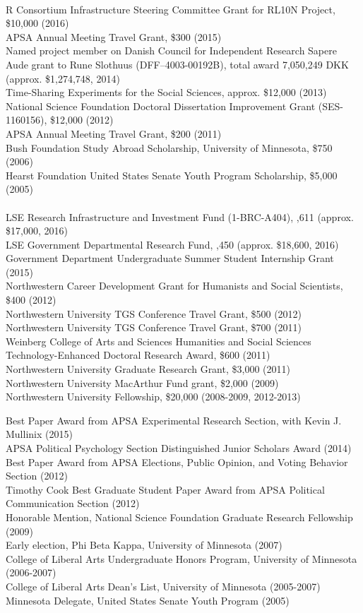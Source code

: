 \documentclass[12pt]{article}
\renewcommand{\section}[1]{\pagebreak[3]%
    \llap{\scshape\smash{\parbox[t]{\marginparwidth}{\raggedright {\color{lg}#1}}}}%
    \vspace{-\baselineskip}\par}
\newcommand{\topic}[1]{\pagebreak[3]\indent {\color{lg}{\footnotesize #1 }}\\}
\newcommand{\entry}[1]{\indent {\color{lg}\guillemotright}\hspace{2pt}#1\vspace{.25em}\\}
\begin{document}
\section{Grants \&\\Funding}
\topic{External Sources}
	\entry{R Consortium Infrastructure Steering Committee Grant for RL10N Project, \$10,000 (2016)}
	\entry{APSA Annual Meeting Travel Grant, \$300 (2015)}
	\entry{Named project member on Danish Council for Independent Research Sapere Aude grant to Rune Slothuus (DFF–4003-00192B), total award 7,050,249 DKK (approx. \$1,274,748, 2014)}
	\entry{Time-Sharing Experiments for the Social Sciences, approx. \$12,000 (2013)}
	\entry{National Science Foundation Doctoral Dissertation Improvement Grant (SES-1160156), \$12,000 (2012)}
	\entry{APSA Annual Meeting Travel Grant, \$200 (2011)}
	\entry{Bush Foundation Study Abroad Scholarship, University of Minnesota, \$750 (2006)}
	\entry{Hearst Foundation United States Senate Youth Program Scholarship, \$5,000 (2005)}
\topic{Institutional Sources}
	\entry{LSE Research Infrastructure and Investment Fund (1-BRC-A404), \textsterling 11,611 (approx. \$17,000, 2016)}
	\entry{LSE Government Departmental Research Fund, ,450 (approx. \$18,600, 2016)}
	\entry{Government Department Undergraduate Summer Student Internship Grant (2015)}
	\entry{Northwestern Career Development Grant for Humanists and Social Scientists, \$400 (2012)}
	\entry{Northwestern University TGS Conference Travel Grant, \$500 (2012)}
	\entry{Northwestern University TGS Conference Travel Grant, \$700 (2011)}
	\entry{Weinberg College of Arts and Sciences Humanities and Social Sciences Technology-Enhanced Doctoral Research Award, \$600 (2011)}
	\entry{Northwestern University Graduate Research Grant, \$3,000 (2011)}
	\entry{Northwestern University MacArthur Fund grant, \$2,000 (2009)}
	\entry{Northwestern University Fellowship, \$20,000 (2008-2009, 2012-2013)}

\section{Honors \&\\Awards}
	\entry{Best Paper Award from APSA Experimental Research Section, with Kevin J. Mullinix (2015)}
	\entry{APSA Political Psychology Section Distinguished Junior Scholars Award (2014)}
	\entry{Best Paper Award from APSA Elections, Public Opinion, and Voting Behavior Section (2012)}
	\entry{Timothy Cook Best Graduate Student Paper Award from APSA Political Communication Section (2012)}
	\entry{Honorable Mention, National Science Foundation Graduate Research Fellowship (2009)}
	\entry{Early election, Phi Beta Kappa, University of Minnesota (2007)}
	\entry{College of Liberal Arts Undergraduate Honors Program, University of Minnesota (2006-2007)}
	\entry{College of Liberal Arts Dean's List, University of Minnesota (2005-2007)}
	\entry{Minnesota Delegate, United States Senate Youth Program (2005)}
\end{document}
